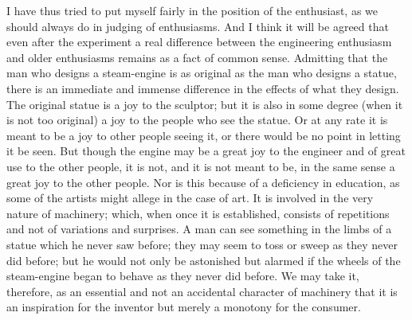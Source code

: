 \documentclass{book}
\begin{document}
I have thus tried to put myself fairly in the position of the enthusiast, as we should always do in judging of enthusiasms. And I think it will be agreed that even after the experiment a real difference between the engineering enthusiasm and older enthusiasms remains as a fact of common sense. Admitting that the man who designs a steam-engine is as original as the man who designs a statue, there is an immediate and immense difference in the effects of what they design. The original statue is a joy to the sculptor; but it is also in some degree (when it is not too original) a joy to the people who see the statue. Or at any rate it is meant to be a joy to other people seeing it, or there would be no point in letting it be seen. But though the engine may be a great joy to the engineer and of great use to the other people, it is not, and it is not meant to be, in the same sense a great joy to the other people. Nor is this because of a deficiency in education, as some of the artists might allege in the case of art. It is involved in the very nature of machinery; which, when once it is established, consists of repetitions and not of variations and surprises. A man can see something in the limbs of a statue which he never saw before; they may seem to toss or sweep as they never did before; but he would not only be astonished but alarmed if the wheels of the steam-engine began to behave as they never did before. We may take it, therefore, as an essential and not an accidental character of machinery that it is an inspiration for the inventor but merely a monotony for the consumer.
\end{document}
